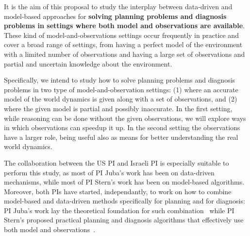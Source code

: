 \documentclass[12pt]{article}
\begin{document}



It is the aim of this proposal to study the interplay between data-driven and model-based approaches 
for {\bf solving planning problems and diagnosis problems in settings where both model and observations are available}. These kind of model-and-observations settings occur frequently in practice and cover a broad range of settings, from having a perfect model of the environment with a limited  number of observations and having a large set of observations and partial and uncertain knowledge about the environment. 


Specifically, we intend to study how to solve planning problems and diagnosis problems in two type of model-and-observation settings: (1) where an accurate model of the world dynamics is given along with a set of observations, and (2) where the given model is partial and possibly inaccurate. 
In the first setting, while reasoning can be done without the given observations, we will explore ways in which observations can speedup it up. In the second setting the observations have a larger role, being useful also as means for better understanding the real world dynamics. 


The collaboration between the US PI and Israeli PI is especially suitable to perform this study, as most of PI Juba's work has been on data-driven mechanisms, while most of PI Stern's work has been on model-based algorithms. Moreover, both PIs have started, independantly, to work on how to combine model-based and data-driven methods specifically for planning and for diagnosis: PI Juba's work lay the theoretical foundation for such combination~\cite{juba2016aaai,juba2016jmlr} while PI Stern's proposed practical planning and diagnosis algorithms that effectively use both model and observations~\cite{elmishali2016dataAugmented,stern2011probably,stern2012search}.
\end{document}
